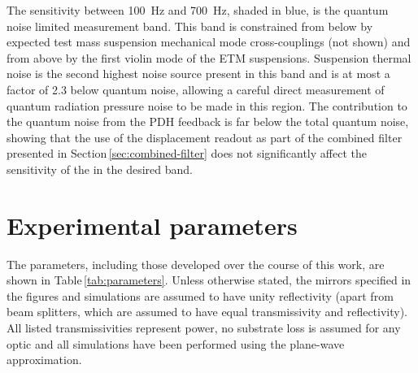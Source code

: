 The sensitivity between \SI{100}{\hertz} and \SI{700}{\hertz}, shaded in blue, is the quantum noise limited measurement band. This band is constrained from below by expected test mass suspension mechanical mode cross-couplings (not shown) and from above by the first violin mode of the \gls{ETM} suspensions. Suspension thermal noise is the second highest noise source present in this band and is at most a factor of \SI{2.3}{} below quantum noise, allowing a careful direct measurement of quantum radiation pressure noise to be made in this region. The contribution to the quantum noise from the \gls{PDH} feedback is far below the total quantum noise, showing that the use of the displacement readout as part of the combined filter presented in Section\,\ref{sec:combined-filter} does not significantly affect the sensitivity of the \SSM{} in the desired band.

\section{\label{sec:control-parameters}Experimental parameters}
The parameters, including those developed over the course of this work, are shown in Table\,\ref{tab:parameters}. Unless otherwise stated, the mirrors specified in the figures and simulations are assumed to have unity reflectivity (apart from beam splitters, which are assumed to have equal transmissivity and reflectivity). All listed transmissivities represent power, no substrate loss is assumed for any optic and all simulations have been performed using the plane-wave approximation.


